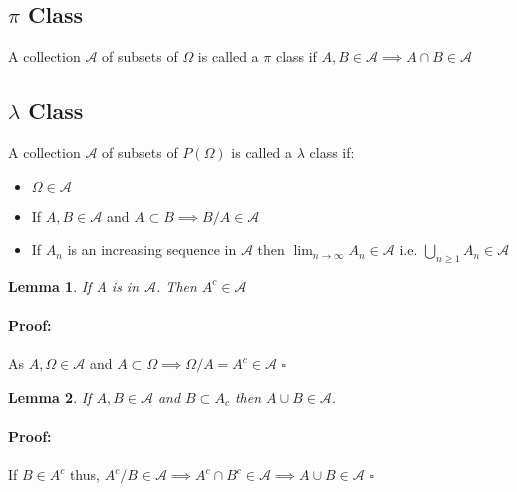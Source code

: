 \documentclass{article}
\newenvironment{proof}{\paragraph{Proof:}}{\hfill$\square$}
\newtheorem{lemma}{Lemma}[section]
\begin{document}
\subsection{$\pi $ Class}
A collection $\mathcal{A} $ of subsets of $\Omega$ is called a ${\pi}$ class if $A,B \in \mathcal{A} \implies A \cap B \in \mathcal{A} $
\subsection{$\lambda$ Class}
A collection $\mathcal{A} $ of subsets of $P(\Omega)$ is called a $\lambda$ class if:
\begin{itemize}
    \item $\Omega \in \mathcal{A} $
    \item If $A,B \in \mathcal{A} $ and $A \subset B \implies B/A \in \mathcal{A} $  
    \item If $A_n$ is an increasing sequence in $\mathcal{A} $ then $\lim_{n \to \infty} A_n \in \mathcal{A} $ i.e. $\bigcup_{n\geq 1} A_n \in \mathcal{A} $     
\end{itemize}

\begin{lemma}
    If A is in $\mathcal{A} $. Then $A^c \in \mathcal{A} $
\end{lemma}
\begin{proof}
    As $A,\Omega \in \mathcal{A} $ and $A \subset \Omega \implies \Omega/A=A^c \in \mathcal{A} $ 
\end{proof}
\begin{lemma}
    If $A,B \in \mathcal{A} $ and $B\subset A_c$ then $A \cup B \in \mathcal{A} $. 
\end{lemma}
\begin{proof}
    If $B \in A^c $ thus, $A^c/B \in \mathcal{A} \implies A^c \cap B^c \in \mathcal{A} \implies A\cup B \in \mathcal{A} $  
\end{proof}
\end{document}
